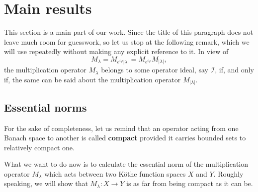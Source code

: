 \documentclass[11pt]{amsart}
\theoremstyle{definition}
\theoremstyle{definition}
\theoremstyle{definition}
\theoremstyle{definition}
\theoremstyle{definition}
\theoremstyle{definition}
\theoremstyle{definition}
\theoremstyle{definition}
\numberwithin{equation}{section}
\numberwithin{equation}{section}
\numberwithin{equation}{section}
\theoremstyle{definition}
\theoremstyle{definition}
\theoremstyle{definition}
\theoremstyle{definition}
\theoremstyle{definition}
\theoremstyle{definition}
\newcommand{\abs}[1]{\left\lvert#1\right\rvert}
\begin{document}
\section{{\bf Main results}} \label{SECTION: ESS NORMS}

This section is a main part of our work. Since the title of this paragraph does not leave much room for guesswork,
so let us stop at the following remark, which we will use repeatedly without making any explicit reference to it.
In view of
\begin{equation*}
	M_{\lambda} = M_{e^{i\varphi} \abs{\lambda}} = M_{e^{i\varphi}}M_{\abs{\lambda}},
\end{equation*}
the multiplication operator $M_{\lambda}$ belongs to some operator ideal, say $\mathscr{I}$, if, and only if, the same can be said about the
multiplication operator $M_{\abs{\lambda}}$.

\subsection{Essential norms} For the sake of completeness, let us remind that an operator acting from one Banach space to another is
called {\bf compact} provided it carries bounded sets to relatively compact one.

What we want to do now is to calculate the essential norm of the multiplication operator $M_{\lambda}$ which acts between two K{\" o}the function spaces $X$ and $Y$.
Roughly speaking, we will show that $M_{\lambda} \colon X \rightarrow Y$ is as far from being compact as it can be.
\end{document}
